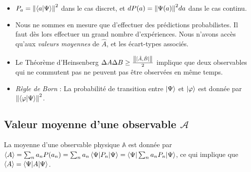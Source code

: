 \documentclass[../notesdecours.tex]{subfiles}
\begin{document}
\begin{center}
\end{center}
\begin{itemize}
\item $P_a = \norm{\braket{a|\Psi}}^2$ dans le cas discret, et $dP(a) = \norm{\Psi(a)}^2da$ dans le cas continu.
\item Nous ne sommes en mesure que d'effectuer des prédictions probabilistes. Il faut dès lors effectuer un grand nombre d'expériences. Nous n'avons accès qu'aux \emph{valeurs moyennes} de $\hat{A}$, et les écart-types associés.
\item Le Théorème d'Heinsenberg $\Delta A\Delta B \geq \frac{\norm{{[\hat{A},\hat{B}]}}}{2}$ implique que deux observables qui ne commutent pas ne peuvent pas être observées en même temps.
\item \textit{Règle de Born} : La probabilité de transition entre $\ket{\Psi}$ et $\ket{\varphi}$ est donnée par $\norm{\braket{\varphi|\Psi}}^2$.
\end{itemize}
\subsection{Valeur moyenne d'une observable $\mathcal{A}$}
La moyenne d'une observable physique $\mathbb{A}$ est donnée par $\langle A\rangle =\sum_n a_n P(a_n) = \sum_n a_n \braket{\Psi|P_n|\Psi} = \braket{\Psi|\sum_n a_n P_n | \Psi}$, ce qui implique que $\langle A\rangle = \braket{\Psi|A|\Psi}$.
\end{document}

